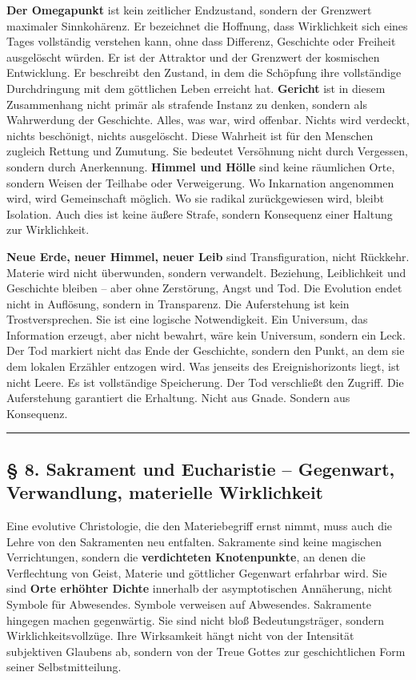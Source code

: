 \documentclass[
  ngerman,
]{article}
\begin{document}
\textbf{Der Omegapunkt} ist kein zeitlicher Endzustand, sondern der
Grenzwert maximaler Sinnkohärenz. Er bezeichnet die Hoffnung, dass
Wirklichkeit sich eines Tages vollständig verstehen kann, ohne dass
Differenz, Geschichte oder Freiheit ausgelöscht würden. Er ist der
Attraktor und der Grenzwert der kosmischen Entwicklung. Er beschreibt
den Zustand, in dem die Schöpfung ihre vollständige Durchdringung mit
dem göttlichen Leben erreicht hat. \textbf{Gericht} ist in diesem
Zusammenhang nicht primär als strafende Instanz zu denken, sondern als
Wahrwerdung der Geschichte. Alles, was war, wird offenbar. Nichts wird
verdeckt, nichts beschönigt, nichts ausgelöscht. Diese Wahrheit ist für
den Menschen zugleich Rettung und Zumutung. Sie bedeutet Versöhnung
nicht durch Vergessen, sondern durch Anerkennung. \textbf{Himmel und
Hölle} sind keine räumlichen Orte, sondern Weisen der Teilhabe oder
Verweigerung. Wo Inkarnation angenommen wird, wird Gemeinschaft möglich.
Wo sie radikal zurückgewiesen wird, bleibt Isolation. Auch dies ist
keine äußere Strafe, sondern Konsequenz einer Haltung zur Wirklichkeit.

\textbf{Neue Erde, neuer Himmel, neuer Leib} sind Transfiguration, nicht
Rückkehr. Materie wird nicht überwunden, sondern verwandelt. Beziehung,
Leiblichkeit und Geschichte bleiben -- aber ohne Zerstörung, Angst und
Tod. Die Evolution endet nicht in Auflösung, sondern in Transparenz. Die
Auferstehung ist kein Trostversprechen. Sie ist eine logische
Notwendigkeit. Ein Universum, das Information erzeugt, aber nicht
bewahrt, wäre kein Universum, sondern ein Leck. Der Tod markiert nicht
das Ende der Geschichte, sondern den Punkt, an dem sie dem lokalen
Erzähler entzogen wird. Was jenseits des Ereignishorizonts liegt, ist
nicht Leere. Es ist vollständige Speicherung. Der Tod verschließt den
Zugriff. Die Auferstehung garantiert die Erhaltung. Nicht aus Gnade.
Sondern aus Konsequenz.

\begin{center}\rule{0.5\linewidth}{0.5pt}\end{center}

\subsection{§ 8. Sakrament und Eucharistie -- Gegenwart, Verwandlung,
materielle
Wirklichkeit}\label{sakrament-und-eucharistie-gegenwart-verwandlung-materielle-wirklichkeit}

Eine evolutive Christologie, die den Materiebegriff ernst nimmt, muss
auch die Lehre von den Sakramenten neu entfalten. Sakramente sind keine
magischen Verrichtungen, sondern die \textbf{verdichteten Knotenpunkte},
an denen die Verflechtung von Geist, Materie und göttlicher Gegenwart
erfahrbar wird. Sie sind \textbf{Orte erhöhter Dichte} innerhalb der
asymptotischen Annäherung, nicht Symbole für Abwesendes. Symbole
verweisen auf Abwesendes. Sakramente hingegen machen gegenwärtig. Sie
sind nicht bloß Bedeutungsträger, sondern Wirklichkeitsvollzüge. Ihre
Wirksamkeit hängt nicht von der Intensität subjektiven Glaubens ab,
sondern von der Treue Gottes zur geschichtlichen Form seiner
Selbstmitteilung.
\end{document}
